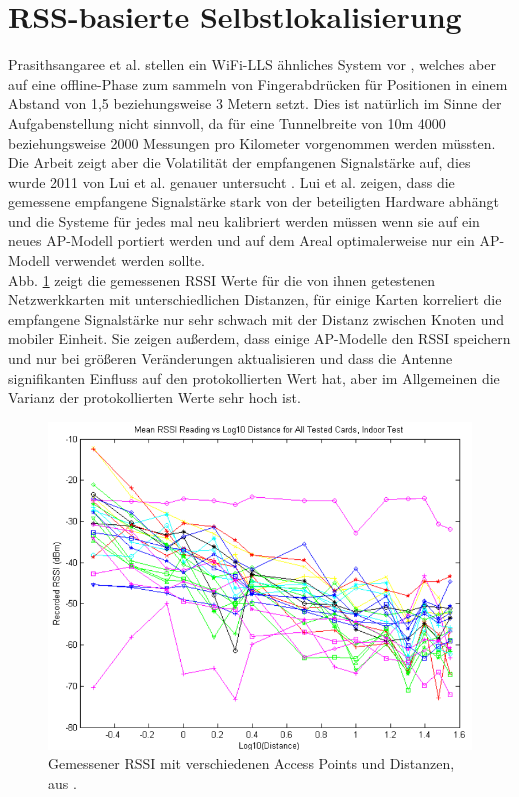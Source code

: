\section{RSS-basierte Selbstlokalisierung}
\label{ch:Vorherige:sec:RSS-basierte}
Prasithsangaree et al. stellen ein WiFi-LLS ähnliches System vor \cite{prasithsangaree2002indoor}, welches aber auf eine offline-Phase zum sammeln von Fingerabdrücken für Positionen in einem Abstand von 1,5 beziehungsweise 3 Metern setzt. 
Dies ist natürlich im Sinne der Aufgabenstellung nicht sinnvoll, da für eine Tunnelbreite von 10m 4000 beziehungsweise 2000 Messungen pro Kilometer vorgenommen werden müssten.\\
Die Arbeit zeigt aber die Volatilität der empfangenen Signalstärke auf, dies wurde 2011 von Lui et al. genauer untersucht \cite{lui2011differences}.
Lui et al. zeigen, dass die gemessene empfangene Signalstärke stark von der beteiligten Hardware abhängt und die Systeme für jedes mal neu kalibriert werden müssen wenn sie auf ein neues AP-Modell portiert werden und auf dem Areal optimalerweise nur ein AP-Modell verwendet werden sollte. \\
Abb. \ref{fig:luiRSSI} zeigt die gemessenen RSSI Werte für die von ihnen getestenen Netzwerkkarten mit unterschiedlichen Distanzen, für einige Karten korreliert die empfangene Signalstärke nur sehr schwach mit der Distanz zwischen Knoten und mobiler Einheit.
Sie zeigen außerdem, dass einige AP-Modelle den RSSI speichern und nur bei größeren Veränderungen aktualisieren und dass die Antenne signifikanten Einfluss auf den protokollierten Wert hat, aber im Allgemeinen die Varianz der protokollierten Werte sehr hoch ist.



\begin{figure}[h]
  \centering
	\includegraphics[width=\textwidth]{images/luiRSSI.png}
  \caption{Gemessener RSSI mit verschiedenen Access Points und Distanzen, aus \cite{lui2011differences}.}
  \label{fig:luiRSSI}
\end{figure}

